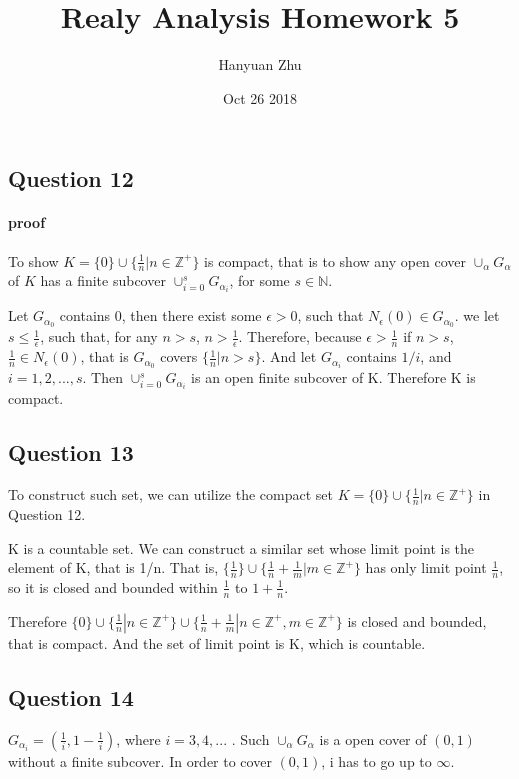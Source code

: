\documentclass{article}
\title{Realy Analysis Homework 5}
\author{Hanyuan Zhu}
\date{Oct 26 2018}
\begin{document}
\maketitle

\subsection*{Question 12}
\paragraph{proof}
To show $K = \{ 0 \} \cup \{ \frac{1}{n} | n \in \mathbb{Z}^{+} \} $ is compact, that is to show any open cover $\cup_{\alpha} G_{\alpha} $ of $ K $ has a finite subcover $ \cup_{i = 0}^{s} G_{\alpha_{i}} $, for some $ s \in \mathbb{N} $.

Let $G_{\alpha_{0}}$ contains 0, then there exist some $\epsilon > 0$, such that $N_{\epsilon}(0) \in G_{\alpha_{0}}$. we let $s \leq \frac{1}{\epsilon}$, such that, for any $n > s$, $n >\frac{1}{\epsilon}$.
Therefore, because  $ \epsilon > \frac{1}{n}$ if $n>s$, $\frac{1}{n} \in N_{\epsilon}(0)$, that is $G_{\alpha_{0}}$ covers $\{ \frac{1}{n} | n > s \}$. And let $G_{\alpha_{i}}$ contains $1/i$, and $i = 1,2,..., s$.
Then $ \cup_{i = 0}^{s} G_{\alpha_{i}}$ is an open finite subcover of K. Therefore K is compact.

\subsection*{Question 13}
To construct such set, we can utilize the compact set $K = \{ 0 \} \cup \{ \frac{1}{n} | n \in \mathbb{Z}^{+} \} $ in Question 12.

K is a countable set. We can construct a similar set whose limit point is the element of K, that is 1/n. That is, $\{ \frac{1}{n} \} \cup \{ \frac{1}{n} + \frac{1}{m} | m \in \mathbb{Z}^{+}\}$ has only limit point $\frac{1}{n}$, so it is closed and bounded within $\frac{1}{n}$ to $1+\frac{1}{n}$.

Therefore $\{ 0 \} \cup \{ \frac{1}{n} | n \in \mathbb{Z}^{+} \} \cup \{ \frac{1}{n} + \frac{1}{m} | n \in \mathbb{Z}^{+}, m \in \mathbb{Z}^{+}\}$ is closed and bounded, that is compact. And the set of limit point is K, which is countable.

\subsection*{Question 14}
$G_{\alpha_{i}}= ( \frac{1}{i}, 1-\frac{1}{i} )$, where $ i = 3, 4, ... $ . Such $\cup_{\alpha}G_{\alpha}$ is a open cover of $(0,1)$ without a finite subcover.
In order to cover $(0,1)$, i has to go up to $\infty$.
\end{document}
